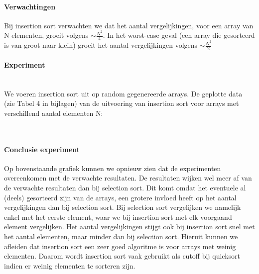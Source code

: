 \documentclass[11pt, a4paper]{article}
\begin{document}
\paragraph{Verwachtingen} Bij insertion sort verwachten we dat het aantal vergelijkingen, voor een array van N elementen, groeit volgens $\sim \frac{N^2}{4}$. In het worst-case geval (een array die gesorteerd is van groot naar klein) groeit het aantal vergelijkingen volgens $\sim \frac{N^2}{2}$ 
\paragraph{Experiment}\hspace{0pt}\\
We voeren insertion sort uit op random gegenereerde arrays. De geplotte data (zie Tabel 4 in bijlagen) van de uitvoering van insertion sort voor arrays met verschillend aantal elementen N:\\
\\
\paragraph{Conclusie experiment} Op bovenstaande grafiek kunnen we opnieuw zien dat de experimenten overeenkomen met de verwachte resultaten. De resultaten wijken wel meer af van de verwachte resultaten dan bij selection sort. Dit komt omdat het eventuele al (deels) gesorteerd zijn van de arrays, een grotere invloed heeft op het aantal vergelijkingen dan bij selection sort. Bij selection sort vergelijken we namelijk enkel met het eerste element, waar we bij insertion sort met elk voorgaand element vergelijken.
\indent Het aantal vergelijkingen stijgt ook bij insertion sort snel met het aantal elementen, maar minder dan bij selection sort. Hieruit kunnen we afleiden dat insertion sort een zeer goed algoritme is voor arrays met weinig elementen. Daarom wordt insertion sort vaak gebruikt als cutoff bij quicksort indien er weinig elementen te sorteren zijn.
\end{document}
